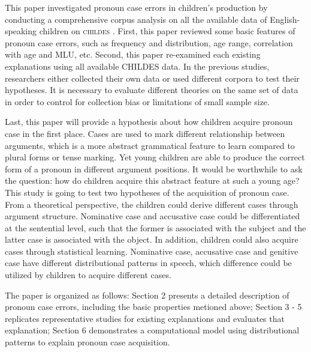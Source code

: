 This paper investigated pronoun case errors in children's production by conducting a comprehensive corpus analysis on all the available data of English-speaking children on \textsc{childes} \citep{macwhinney2014childes}. First, this paper reviewed some basic features of pronoun case errors, such as frequency and distribution, age range, correlation with age and MLU, etc. Second, this paper re-examined each existing explanations using all available CHILDES data. In the previous studies, researchers either collected their own data or used different corpora to test their hypotheses. It is necessary to evaluate different theories on the same set of data in order to control for collection bias or limitations of small sample size. 

Last, this paper will provide a hypothesis about how children acquire pronoun case in the first place. Cases are used to mark different relationship between arguments, which is a more abstract grammatical feature to learn compared to plural forms or tense marking. Yet young children are able to produce the correct form of a pronoun in different argument positions. It would be worthwhile to ask the question: how do children acquire this abstract feature at such a young age? This study is going to test two hypotheses of the acquisition of pronoun case. From a theoretical perspective, the children could derive different cases through argument structure. Nominative case and accusative case could be differentiated at the sentential level, such that the former is associated with the subject and the latter case is associated with the object. In addition, children could also acquire cases through statistical learning. Nominative case, accusative case and genitive case have different distributional patterns in speech, which difference could be utilized by children to acquire different cases. 

The paper is organized as follows: Section 2 presents a detailed description of pronoun case errors, including the basic properties metioned above; Section 3 - 5 replicates representative studies for existing explanations and evaluates that explanation; Section 6 demonstrates a computational model using distributional patterns to explain pronoun case acquisition.